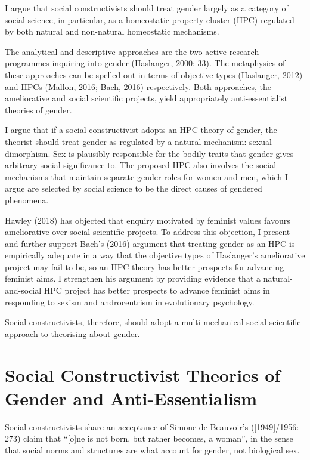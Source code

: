 I argue that social constructivists should treat gender largely as a
category of social science, in particular, as a homeostatic property
cluster (HPC) regulated by both natural and non-natural homeostatic
mechanisms.

The analytical and descriptive approaches are the two active research
programmes inquiring into gender (Haslanger, 2000: 33). The metaphysics
of these approaches can be spelled out in terms of objective types
(Haslanger, 2012) and HPCs (Mallon, 2016; Bach, 2016) respectively. Both
approaches, the ameliorative and social scientific projects, yield
appropriately anti-essentialist theories of gender.

I argue that if a social constructivist adopts an HPC theory of gender,
the theorist should treat gender as regulated by a natural mechanism:
sexual dimorphism. Sex is plausibly responsible for the bodily traits
that gender gives arbitrary social significance to. The proposed HPC
also involves the social mechanisms that maintain separate gender roles
for women and men, which I argue are selected by social science to be
the direct causes of gendered phenomena.

Hawley (2018) has objected that enquiry motivated by feminist values
favours ameliorative over social scientific projects. To address this
objection, I present and further support Bach's (2016) argument that
treating gender as an HPC is empirically adequate in a way that the
objective types of Haslanger's ameliorative project may fail to be, so
an HPC theory has better prospects for advancing feminist aims. I
strengthen his argument by providing evidence that a natural-and-social
HPC project has better prospects to advance feminist aims in responding
to sexism and androcentrism in evolutionary psychology.

Social constructivists, therefore, should adopt a multi-mechanical
social scientific approach to theorising about gender.

\section*{Social Constructivist Theories of Gender and Anti-Essentialism}

Social constructivists share an acceptance of Simone de Beauvoir's
({[}1949{]}/1956: 273) claim that ``{[}o{]}ne is not born, but rather
becomes, a woman'', in the sense that social norms and structures are
what account for gender, not biological sex.

